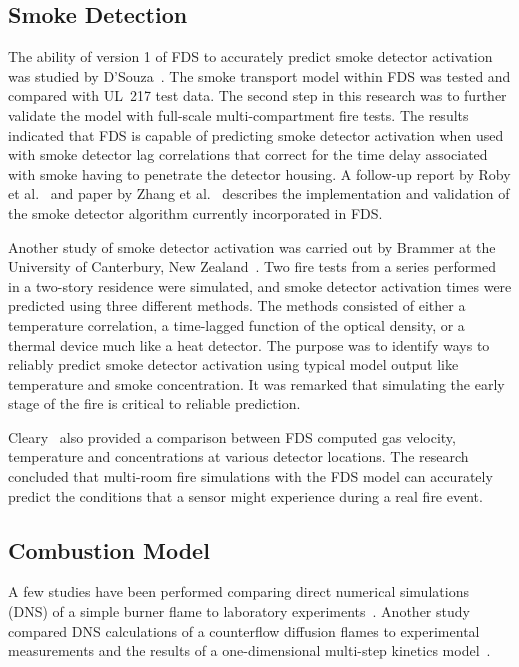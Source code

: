 \subsection{Smoke Detection}

The ability of version 1 of FDS to accurately predict smoke detector activation was studied by D'Souza~\cite{DSouza:1}. The smoke transport model within FDS was tested and compared with UL~217 test data. The second step in this research was to further validate the model with full-scale multi-compartment fire tests. The results indicated that FDS is capable of predicting smoke detector activation when used with smoke detector lag correlations that correct for the time delay associated with smoke having to penetrate the detector housing. A follow-up report by Roby et al.~\cite{CSE_GCR} and paper by Zhang et al.~\cite{Zhang:FSJ2008} describes the implementation and validation of the smoke detector algorithm currently incorporated in FDS.

Another study of smoke detector activation was carried out by Brammer at the University of Canterbury, New Zealand~\cite{Brammer:1}. Two fire tests from a series performed in a two-story residence were simulated, and smoke detector activation times were predicted using three different methods. The methods consisted of either a temperature correlation, a time-lagged function of the optical density, or a thermal device much like a heat detector. The purpose was to identify ways to reliably predict smoke detector activation using typical model output like temperature and smoke concentration. It was remarked that simulating the early stage of the fire is critical to reliable prediction.

Cleary~\cite{Cleary:1} also provided a comparison between FDS computed gas velocity, temperature and concentrations at various detector locations.  The research concluded that multi-room fire simulations with the FDS model can accurately predict the conditions that a sensor might experience during a real fire event.




\subsection{Combustion Model}

A few studies have been performed comparing direct numerical simulations (DNS) of a simple burner flame to laboratory experiments~\cite{Mukhopadhyay:1}. Another study compared DNS calculations of a counterflow diffusion flames to experimental measurements and the results of a one-dimensional multi-step kinetics model~\cite{Hamins:NASA}.

